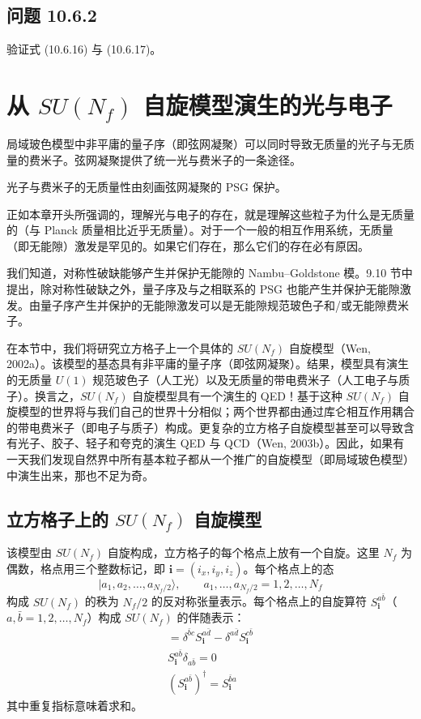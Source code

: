 \subsection*{问题 10.6.2}

验证式 (10.6.16) 与 (10.6.17)。

\section{从 $SU(N_f)$ 自旋模型演生的光与电子}

\begin{keypoints}
\item 局域玻色模型中非平庸的量子序（即弦网凝聚）可以同时导致无质量的光子与无质量的费米子。弦网凝聚提供了统一光与费米子的一条途径。
\item 光子与费米子的无质量性由刻画弦网凝聚的 PSG 保护。
\end{keypoints}

正如本章开头所强调的，理解光与电子的存在，就是理解这些粒子为什么是无质量的（与 Planck 质量相比近乎无质量）。对于一个一般的相互作用系统，无质量（即无能隙）激发是罕见的。如果它们存在，那么它们的存在必有原因。

我们知道，对称性破缺能够产生并保护无能隙的 Nambu--Goldstone 模。9.10 节中提出，除对称性破缺之外，量子序及与之相联系的 PSG 也能产生并保护无能隙激发。由量子序产生并保护的无能隙激发可以是无能隙规范玻色子和/或无能隙费米子。

在本节中，我们将研究立方格子上一个具体的 $SU(N_f)$ 自旋模型（Wen, 2002a）。该模型的基态具有非平庸的量子序（即弦网凝聚）。结果，模型具有演生的无质量 $U(1)$ 规范玻色子（人工光）以及无质量的带电费米子（人工电子与质子）。换言之，$SU(N_f)$ 自旋模型具有一个演生的 QED！基于这种 $SU(N_f)$ 自旋模型的世界将与我们自己的世界十分相似；两个世界都由通过库仑相互作用耦合的带电费米子（即电子与质子）构成。更复杂的立方格子自旋模型甚至可以导致含有光子、胶子、轻子和夸克的演生 QED 与 QCD（Wen, 2003b）。因此，如果有一天我们发现自然界中所有基本粒子都从一个推广的自旋模型（即局域玻色模型）中演生出来，那也不足为奇。

\subsection{立方格子上的 $SU(N_f)$ 自旋模型}

该模型由 $SU(N_f)$ 自旋构成，立方格子的每个格点上放有一个自旋。这里 $N_f$ 为偶数，格点用三个整数标记，即 $\pmb i=(i_x,i_y,i_z)$。每个格点上的态
\begin{equation*}
|a_1,a_2,\dots,a_{N_f/2}\rangle,\qquad a_1,\dots,a_{N_f/2}=1,2,\dots,N_f
\end{equation*}
构成 $SU(N_f)$ 的秩为 $N_f/2$ 的反对称张量表示。每个格点上的自旋算符 $S^{a\bar b}_{\pmb i}$（$a,\bar b=1,2,\dots,N_f$）构成 $SU(N_f)$ 的伴随表示：
\begin{gather*}
[S^{a\bar b}_{\pmb i},S^{c\bar d}_{\pmb i}]=\delta^{\bar b c}S^{a\bar d}_{\pmb i}-\delta^{a\bar d}S^{c\bar b}_{\pmb i}\\
S^{a\bar b}_{\pmb i}\delta_{a\bar b}=0\\
(S^{a\bar b}_{\pmb i})^{\dagger}=S^{\bar b a}_{\pmb i}\tag{10.7.1}
\end{gather*}
其中重复指标意味着求和。

